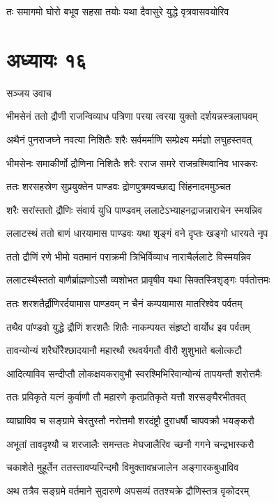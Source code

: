 \twolineshloka
{तः समागमो घोरो बभूव सहसा तयोः}
{यथा दैवासुरे युद्धे वृत्रवासवयोरिव}


\chapter{अध्यायः १६}
\twolineshloka
{सञ्जय उवाच}
{}


\twolineshloka
{भीमसेनं ततो द्रौणी राजन्विव्याध पत्रिणा}
{परया त्वरया युक्तो दर्शयन्नस्त्रलाघवम्}


\twolineshloka
{अथैनं पुनराजघ्ने नवत्या निशितैः शरैः}
{सर्वमर्माणि सम्प्रेक्ष्य मर्मज्ञो लघुहस्तवत्}


\twolineshloka
{भीमसेनः समाकीर्णो द्रौणिना निशितैः शरैः}
{रराज समरे राजन्रश्मिवानिव भास्करः}


\twolineshloka
{ततः शरसहस्रेण सुप्रयुक्तेन पाण्डवः}
{द्रोणपुत्रमवच्छाद्य सिंहनादममुञ्चत}


\twolineshloka
{शरैः सरांस्ततो द्रौणिः संवार्य युधि पाण्डवम्}
{ललाटेऽभ्याहनद्राजन्नाराचेन स्मयन्निव}


\twolineshloka
{ललाटस्थं ततो बाणं धारयामास पाण्डवः}
{यथा शृङ्गं वने दृप्तः खङ्गो धारयते नृप}


\twolineshloka
{ततो द्रौणिं रणे भीमो यतमानं पराक्रमी}
{त्रिभिर्विव्याध नाराचैर्ललाटे विस्मयन्निव}


\twolineshloka
{ललाटस्थैस्ततो बाणैर्ब्राह्मणोऽसौ व्यशोभत}
{प्रावृषीव यथा सिक्तस्त्रिशृङ्गः पर्वतोत्तमः}


\twolineshloka
{ततः शरशतैर्द्रौणिरर्दयामास पाण्डवम्}
{न चैनं कम्पयामास मातरिश्वेव पर्वतम्}


\twolineshloka
{तथैव पांण्डवो युद्धे द्रौणिं शरशतैः शितैः}
{नाकम्पयत संहृष्टो वार्योध इव पर्वतम्}


\twolineshloka
{तावन्योन्यं शरैर्घोरैश्छादयानौ महारथौ}
{रथवर्यगतौ वीरौ शुशुभाते बलोत्कटौ}


\twolineshloka
{आदित्याविव सन्दीप्तौ लोकक्षयकरावुभौ}
{स्वरश्मिभिरिवान्योन्यं तापयन्तौ शरोत्तमैः}


\twolineshloka
{ततः प्रविकृते यत्नं कुर्वाणौ तौ महारणे}
{कृतप्रतिकृते यत्तौ शरसङ्घैरभीतवत्}


\twolineshloka
{व्याघ्राविव च सङ्ग्रामे चेरतुस्तौ नरोत्तमौ}
{शरदंष्ट्रौ दुराधर्षौ चापवक्रौ भयङ्करौ}


\twolineshloka
{अभूतां तावदृश्यौ च शरजालैः समन्ततः}
{मेघजालैरिव च्छनौ गगने चन्द्रभास्करौ}


\twolineshloka
{चकाशेते मुहूर्तेन ततस्तावप्यरिन्दमौ}
{विमुक्तावभ्रजालेन अङ्गारकबुधाविव}


\twolineshloka
{अथ तत्रैव सङ्ग्रमे वर्तमाने सुदारुणे}
{अपसव्यं ततश्चक्रे द्रौणिस्तत्र वृकोदरम्}


